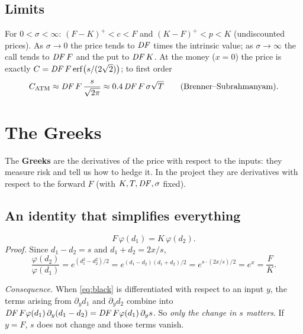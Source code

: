 \subsection{Limits}
For $0<\sigma<\infty$: $(F-K)^+<c<F$ and $(K-F)^+<p<K$ (undiscounted prices). As $\sigma\to0$ the price tends to
$\mathit{DF}$ times the intrinsic value; as $\sigma\to\infty$ the call tends to $\mathit{DF}\,F$ and the put to $\mathit{DF}\,K$. At the money
($x=0$) the price is exactly $C=\mathit{DF}\,F\,\mathrm{erf}\big(s/(2\sqrt2)\big)$; to first order
\begin{equation}\label{eq:brenner}
C_{\text{ATM}}\approx\mathit{DF}\,F\,\frac{s}{\sqrt{2\pi}}\approx0.4\,\mathit{DF}\,F\,\sigma\sqrt T\qquad\text{(Brenner--Subrahmanyam)}.
\end{equation}

\section{The Greeks}
The \textbf{Greeks} are the derivatives of the price with respect to the inputs: they measure risk and tell us how
to hedge it. In the project they are derivatives with respect to the forward $F$ (with $K,T,\mathit{DF},\sigma$ fixed).

\subsection{An identity that simplifies everything}
\begin{equation}\label{eq:identita-phi}
F\,\varphi(d_1)=K\,\varphi(d_2).
\end{equation}
\emph{Proof.} Since $d_1-d_2=s$ and $d_1+d_2=2x/s$,
\[
\frac{\varphi(d_2)}{\varphi(d_1)}=e^{(d_1^2-d_2^2)/2}=e^{(d_1-d_2)(d_1+d_2)/2}=e^{s\cdot(2x/s)/2}=e^{x}=\frac FK .
\]

\emph{Consequence.} When \eqref{eq:black} is differentiated with respect to an input $y$, the terms arising from
$\partial_yd_1$ and $\partial_yd_2$ combine into $\mathit{DF}\,F\varphi(d_1)\,\partial_y(d_1-d_2)=\mathit{DF}\,F\varphi(d_1)\,\partial_ys$.
So \emph{only the change in $s$ matters}. If $y=F$, $s$ does not change and those terms vanish.

